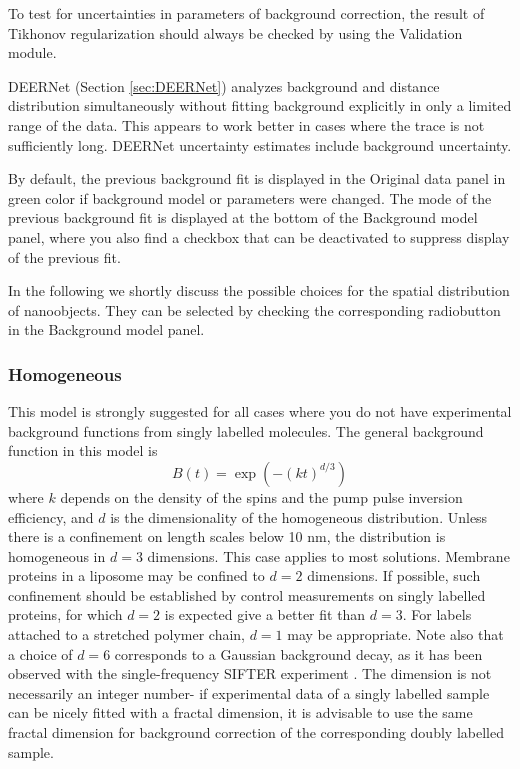 \documentclass{article}
\begin{document}
To test for uncertainties in parameters of background correction, the result of Tikhonov regularization should always be checked by using the {\ttfamily Validation} module.

DEERNet (Section \ref{sec:DEERNet}) analyzes background and distance distribution simultaneously without fitting background explicitly in only a limited range of the data. This appears to work better in cases where the trace is not sufficiently long. DEERNet uncertainty estimates include background uncertainty.

By default, the previous background fit is displayed in the {\ttfamily Original data} panel in green color if background model or parameters were changed. The mode of the previous background fit is displayed at the bottom of the {\ttfamily Background model} panel, where you also find a checkbox that can be deactivated to suppress display of the previous fit.

In the following we shortly discuss the possible choices for the spatial distribution
of nanoobjects. They can be selected by checking the corresponding radiobutton in the {\ttfamily Background model} panel.

\subsubsection{Homogeneous}
This model is strongly suggested for all cases where you do not have experimental background functions from singly labelled molecules. The general background function in this model is
\begin{equation}
	B \left( t \right) = \exp \left( -(k t)^{d/3} \right) 
\end{equation}
where $k$ depends on the density of the spins and the pump pulse inversion efficiency, and $d$ is the dimensionality of the homogeneous distribution. Unless there is a confinement on length scales below 10 nm, the distribution is homogeneous in $d=3$ dimensions. This case applies to most solutions. Membrane proteins in a liposome may be confined to $d=2$ dimensions. If possible, such confinement should be established by control measurements on singly labelled proteins, for which $d=2$ is expected give a better fit than $d=3$. For labels attached to a stretched polymer chain, $d=1$ may be appropriate. Note also that a choice of $d=6$ corresponds to a Gaussian background decay, as it has been observed with the single-frequency SIFTER experiment \cite{sifter}. The dimension is not necessarily an integer number- if experimental data of a singly labelled sample can be nicely fitted with a fractal dimension, it is advisable to use the same fractal dimension for background correction of the corresponding doubly labelled sample.
\end{document}

